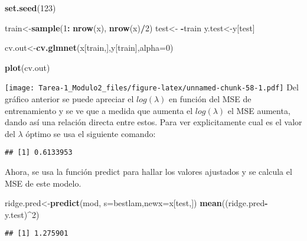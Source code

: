 \documentclass[
]{article}
\newenvironment{Shaded}{\begin{snugshade}}{\end{snugshade}}
\newcommand{\DataTypeTok}[1]{\textcolor[rgb]{0.13,0.29,0.53}{#1}}
\newcommand{\DecValTok}[1]{\textcolor[rgb]{0.00,0.00,0.81}{#1}}
\newcommand{\KeywordTok}[1]{\textcolor[rgb]{0.13,0.29,0.53}{\textbf{#1}}}
\newcommand{\NormalTok}[1]{#1}
\newcommand{\OperatorTok}[1]{\textcolor[rgb]{0.81,0.36,0.00}{\textbf{#1}}}
\newcommand{\StringTok}[1]{\textcolor[rgb]{0.31,0.60,0.02}{#1}}
\begin{document}
\begin{Shaded}
\begin{Highlighting}[]
\KeywordTok{set.seed}\NormalTok{(}\DecValTok{123}\NormalTok{)}

\NormalTok{train<-}\KeywordTok{sample}\NormalTok{(}\DecValTok{1}\OperatorTok{:}\StringTok{ }\KeywordTok{nrow}\NormalTok{(x), }\KeywordTok{nrow}\NormalTok{(x)}\OperatorTok{/}\DecValTok{2}\NormalTok{)}
\NormalTok{test<-}\StringTok{ }\OperatorTok{-}\NormalTok{train}
\NormalTok{y.test<-y[test]}

\NormalTok{cv.out<-}\KeywordTok{cv.glmnet}\NormalTok{(x[train,],y[train],}\DataTypeTok{alpha=}\DecValTok{0}\NormalTok{)}

\KeywordTok{plot}\NormalTok{(cv.out)}
\end{Highlighting}
\end{Shaded}

\texttt{[image: Tarea-1\_Modulo2\_files/figure-latex/unnamed-chunk-58-1.pdf]}
Del gráfico anterior se puede apreciar el \(log(\lambda)\) en función
del MSE de entrenamiento y se ve que a medida que aumenta el
\(log(\lambda)\) el MSE aumenta, dando así una relación directa entre
estos. Para ver explicitamente cual es el valor del \(\lambda\) óptimo
se usa el siguiente comando:

\begin{Shaded}
\end{Shaded}

\begin{verbatim}
## [1] 0.6133953
\end{verbatim}

Ahora, se usa la función predict para hallar los valores ajustados y se
calcula el MSE de este modelo.

\begin{Shaded}
\begin{Highlighting}[]
\NormalTok{ridge.pred<-}\KeywordTok{predict}\NormalTok{(mod, }\DataTypeTok{s=}\NormalTok{bestlam,}\DataTypeTok{newx=}\NormalTok{x[test,])}
\KeywordTok{mean}\NormalTok{((ridge.pred}\OperatorTok{-}\NormalTok{y.test)}\OperatorTok{^}\DecValTok{2}\NormalTok{)}
\end{Highlighting}
\end{Shaded}

\begin{verbatim}
## [1] 1.275901
\end{verbatim}
\end{document}
